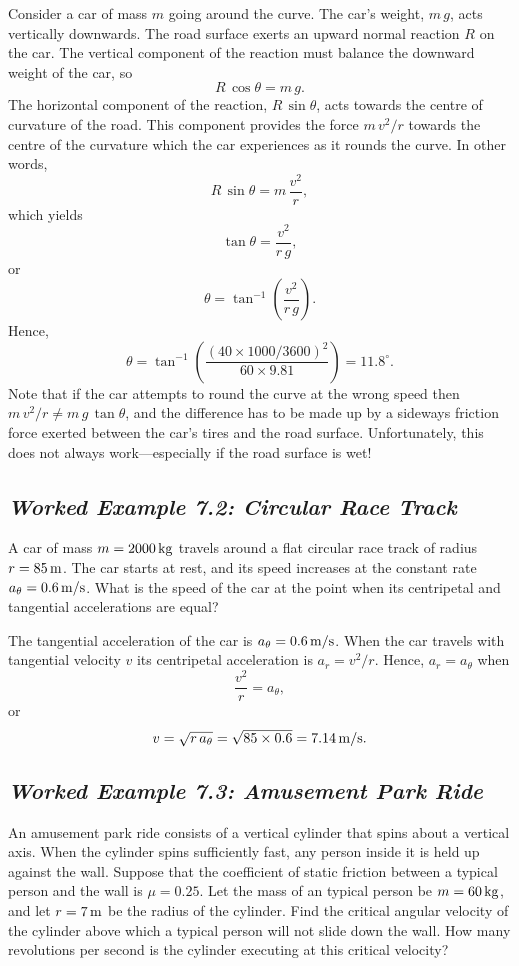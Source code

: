  Consider a car of mass $m$ going around the curve. The car's
weight, $m\,g$, acts vertically downwards. The road surface exerts an upward normal reaction $R$
on the car.
The vertical component of the reaction must balance the downward weight of the car, so
$$
R\,\cos\theta = m\,g.
$$
The horizontal component of the reaction, $R\,\sin\theta$, acts towards the centre of curvature of
the road.  This 
component provides the force $m\,v^2/r$ towards the centre of the curvature which the
car experiences as it rounds the curve. In other words,
$$
 R\,\sin\theta = m\,\frac{v^2}{r},
$$
which yields
$$
\tan\theta = \frac{v^2}{r\,g}, 
$$
or
$$
\theta =\tan^{-1}\left(\frac{v^2}{r\,g}\right).
$$
Hence,
$$
\theta = \tan^{-1}\left(\frac{(40\times 1000/3600)^2}{60\times9.81}\right)= 11.8^\circ.
$$
Note that if the car attempts to round the curve at the wrong speed then
$m\,v^2/r\neq m\,g\,\tan\theta$, and the difference has to be made up by a
sideways friction force exerted between the car's tires and the road surface. Unfortunately,
this does not always work---especially if the road surface is wet!

\subsection*{\em Worked Example 7.2: Circular Race Track}
 A car of mass $m=2000\,{\rm kg}$ travels around a flat
circular race track of radius $r = 85\,{\rm m}$. The car starts at rest, and its
speed increases at the constant rate $a_\theta = 0.6\,{\rm m/s}$. What is the speed
of the car at the point when its centripetal and tangential accelerations are equal?

 The tangential acceleration of the car is $a_\theta = 0.6\,{\rm m/s}$.
When the car travels with tangential velocity $v$ its centripetal acceleration is
$a_r=v^2/r$. Hence, $a_r = a_\theta$ when
$$
\frac{v^2}{r} = a_\theta,
$$
or
$$
v = \sqrt{r\, a_\theta} = \sqrt{85\times 0.6} = 7.14\,{\rm m/s}.
$$

\subsection*{\em Worked Example 7.3: Amusement Park Ride}
 An amusement park ride consists of a vertical cylinder that
spins about a vertical axis. When the cylinder spins sufficiently fast, any person
inside it is held up against the wall. Suppose that the coefficient of static
friction between a typical person and the wall is $\mu=0.25$. Let the mass of an typical
person be $m=60\,{\rm kg}$, and let $r=7\,{\rm m}$ be the radius of the cylinder. 
Find the critical angular velocity of the cylinder above which a typical person
will not slide down the wall. How many revolutions per second
is the cylinder executing at this critical velocity?

